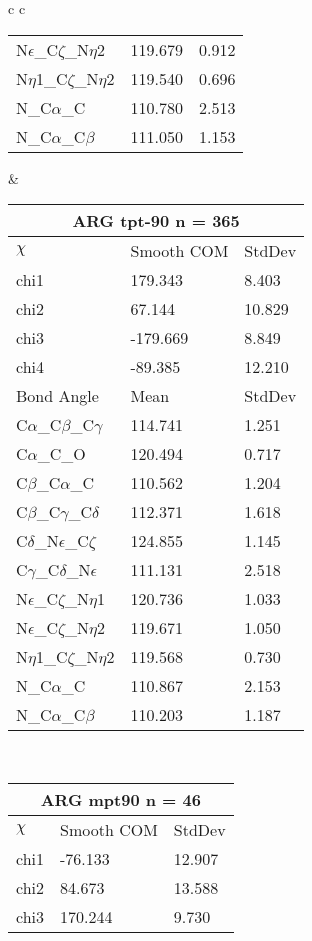 \begin{longtable}{ c c }
\begin{tabular}{ l l l }
  N$\epsilon$\_C$\zeta$\_N$\eta$2 & 119.679 & 0.912\\
  N$\eta$1\_C$\zeta$\_N$\eta$2 & 119.540 & 0.696\\
  N\_C$\alpha$\_C & 110.780 & 2.513\\
  N\_C$\alpha$\_C$\beta$ & 111.050 & 1.153\\
  \bottomrule
  \end{tabular}
  &
  \begin{tabular}{ l l l }
  \toprule
  \multicolumn{3}{c}{ARG \textbf{tpt-90} n = 365} \\ \toprule
  $\chi$       & Smooth COM & StdDev \\ \midrule
  chi1 & 179.343 & 8.403 \\ 
  chi2 & 67.144 & 10.829 \\ 
  chi3 & -179.669 & 8.849 \\ 
  chi4 & -89.385 & 12.210 \\ \midrule
  Bond Angle   & Mean     & StdDev \\ \midrule
  C$\alpha$\_C$\beta$\_C$\gamma$ & 114.741 & 1.251\\
  C$\alpha$\_C\_O & 120.494 & 0.717\\
  C$\beta$\_C$\alpha$\_C & 110.562 & 1.204\\
  C$\beta$\_C$\gamma$\_C$\delta$ & 112.371 & 1.618\\
  C$\delta$\_N$\epsilon$\_C$\zeta$ & 124.855 & 1.145\\
  C$\gamma$\_C$\delta$\_N$\epsilon$ & 111.131 & 2.518\\
  N$\epsilon$\_C$\zeta$\_N$\eta$1 & 120.736 & 1.033\\
  N$\epsilon$\_C$\zeta$\_N$\eta$2 & 119.671 & 1.050\\
  N$\eta$1\_C$\zeta$\_N$\eta$2 & 119.568 & 0.730\\
  N\_C$\alpha$\_C & 110.867 & 2.153\\
  N\_C$\alpha$\_C$\beta$ & 110.203 & 1.187\\
  \bottomrule
  \end{tabular}
  \\
  \begin{tabular}{ l l l }
  \toprule
  \multicolumn{3}{c}{ARG \textbf{mpt90} n = 46} \\ \toprule
  $\chi$       & Smooth COM & StdDev \\ \midrule
  chi1 & -76.133 & 12.907 \\ 
  chi2 & 84.673 & 13.588 \\ 
  chi3 & 170.244 & 9.730 \\ 

\end{tabular}
\end{longtable}
